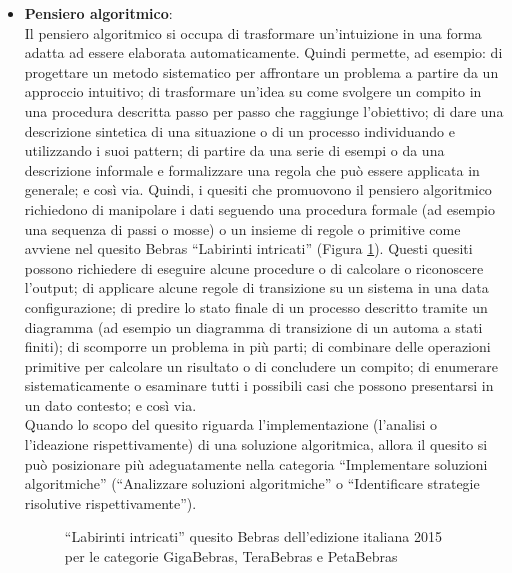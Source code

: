 \documentclass[12pt]{report}
\begin{document}
\begin{itemize}
\bigskip
	\item \textbf{Pensiero algoritmico}: 
	\\
	Il pensiero algoritmico si occupa di trasformare un'intuizione in una forma adatta ad essere elaborata automaticamente. Quindi permette, ad esempio: di progettare un metodo sistematico per affrontare un problema a partire da un approccio intuitivo; di trasformare un'idea su come svolgere un compito in una procedura descritta passo per passo che raggiunge l'obiettivo; di dare una descrizione sintetica di una situazione o di un processo individuando e utilizzando i suoi pattern; di partire da una serie di esempi o da una descrizione informale e formalizzare una regola che può essere applicata in generale; e così via.
	Quindi, i quesiti che promuovono il pensiero algoritmico richiedono di manipolare i dati seguendo una procedura formale (ad esempio una sequenza di passi o mosse) o un insieme di regole o primitive come avviene nel quesito Bebras ``Labirinti intricati'' (Figura \ref{labirinti}).
	Questi quesiti possono richiedere di eseguire alcune procedure o di calcolare o riconoscere l'output; di applicare alcune regole di transizione su un sistema in una data configurazione; di predire lo stato finale di un processo descritto tramite un diagramma (ad esempio un diagramma di transizione di un automa a stati finiti); di scomporre un problema in più parti; di combinare delle operazioni primitive per calcolare un risultato o di concludere un compito; di enumerare sistematicamente o esaminare tutti i possibili casi che possono presentarsi in un dato contesto; e così via.
	\\
	Quando lo scopo del quesito riguarda l'implementazione (l'analisi o l'ideazione rispettivamente) di una soluzione algoritmica, allora il quesito si può posizionare più adeguatamente nella categoria ``Implementare soluzioni algoritmiche'' (``Analizzare soluzioni algoritmiche'' o ``Identificare strategie risolutive rispettivamente'').
	
	\begin{figure}[h]
		\centering
		\caption{``Labirinti intricati'' quesito Bebras dell'edizione italiana 2015 per le categorie GigaBebras, TeraBebras e PetaBebras}\label{labirinti}
	\end{figure}



\end{itemize}
\end{document}
